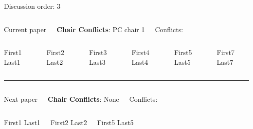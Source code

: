 \documentclass[9pt,t,serif]{beamer}
\begin{document}
\begin{frame}[t]{Discussion order: 3}
\begin{columns}[t]
Current paper 

\textbf{Chair Conflicts}: PC chair 1

Conflicts:

\vspace{10pt}

\end{columns}
\begin{columns}[t]
First1 Last1

First2 Last2

First3 Last3

First4 Last4

First5 Last5

First7 Last7

\end{columns}
\vspace{10pt}
\hrule
\vspace{10pt}
\begin{columns}[t]


 Next paper

\textbf{Chair Conflicts}: None

Conflicts:

\vspace{10pt}

\end{columns}
\begin{columns}[t]
First1 Last1

First2 Last2

First5 Last5

\end{columns}
\end{frame}
\end{document}

